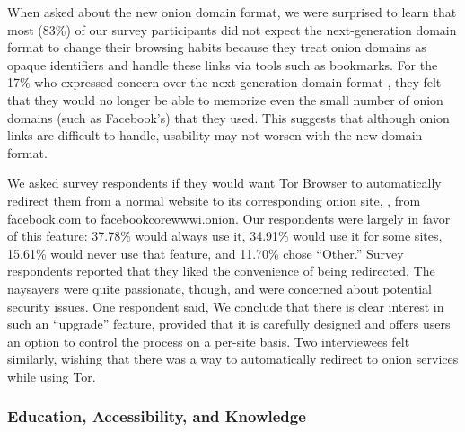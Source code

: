 
When asked about the new onion domain format, we were surprised to learn that
most (83\%) of our survey participants did not expect the next-generation domain
format to change their browsing habits because they treat onion domains as
opaque identifiers and handle these links via tools such as bookmarks.  For the
17\% who expressed concern over the next generation domain format , they felt that they would no longer be able to memorize
even the small number of onion domains (such as Facebook's) that they used.
This suggests that although onion links are difficult to handle, usability may
not worsen with the new domain format.

We asked survey respondents if they would want Tor Browser to automatically
redirect them from a normal website to its corresponding onion site, \eg, from
facebook.com to facebookcorewwwi.onion.  Our respondents were largely in favor
of this feature: 37.78\% would always use it, 34.91\% would use it for some
sites, 15.61\% would never use that feature, and 11.70\% chose ``Other.'' Survey
respondents reported that they liked the convenience of being redirected.  The
naysayers were quite passionate, though, and were concerned about potential
security issues.  One respondent said, 
  We conclude
that there is clear interest in such an ``upgrade'' feature, provided that it is
carefully designed and offers users an option to control the process on a
per-site basis.  Two interviewees felt similarly, wishing that there was a way
to automatically redirect to onion services while using Tor.

\subsubsection{Education, Accessibility, and Knowledge}

